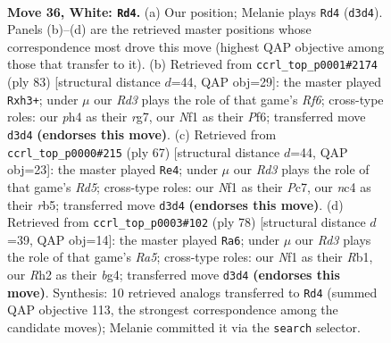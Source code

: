 \documentclass[11pt]{article}
\begin{document}
\clearpage

\begin{figure}[p]\centering
\begin{subfigure}{0.46\textwidth}\centering
\resizebox{\linewidth}{!}{%
\newchessgame
\chessboard[
  setfen={r1b1k3/8/8/1r6/2n4p/p2R3P/6PR/K4N2 w q - 0 36},
  showmover=false,
  pgfstyle=straightmove, color=movearrow, markmove={d3-d4}
]}
\caption{}
\end{subfigure}\hfill
\begin{subfigure}{0.46\textwidth}\centering
\resizebox{\linewidth}{!}{%
\newchessgame
\chessboard[
  setfen={8/6R1/2k2p2/4p3/7p/3P1r1P/2r5/3RB2K b - - 3 42},
  showmover=false,
  pgfstyle=straightmove, color=movearrow, markmove={f3-h3}
]}
\caption{}
\end{subfigure}
\\[4pt]
\begin{subfigure}{0.46\textwidth}\centering
\resizebox{\linewidth}{!}{%
\newchessgame
\chessboard[
  setfen={2k4r/2p5/8/1R6/1P1r1p1p/P6P/2K5/5R2 b - - 0 34},
  showmover=false,
  pgfstyle=straightmove, color=movearrow, markmove={d4-e4}
]}
\caption{}
\end{subfigure}\hfill
\begin{subfigure}{0.46\textwidth}\centering
\resizebox{\linewidth}{!}{%
\newchessgame
\chessboard[
  setfen={8/p3rp2/6pk/RP6/P5bp/8/5P1K/1R6 w - - 2 40},
  showmover=false,
  pgfstyle=straightmove, color=movearrow, markmove={a5-a6}
]}
\caption{}
\end{subfigure}
\caption{\textbf{Move 36, White: \texttt{Rd4}.} (a) Our position; Melanie plays \texttt{Rd4} (\texttt{d3d4}). Panels (b)--(d) are the retrieved master positions whose correspondence most drove this move (highest QAP objective among those that transfer to it). (b) Retrieved from \texttt{ccrl\_top\_p0001\#2174} (ply 83) [structural distance $d$=44, QAP obj=29]: the master played \texttt{Rxh3+}; under $\mu$ our \emph{Rd3} plays the role of that game's \emph{Rf6}; cross-type roles: our \emph{p}h4 as their \emph{r}g7, our \emph{N}f1 as their \emph{P}f6; transferred move \texttt{d3d4} \textbf{(endorses this move)}. (c) Retrieved from \texttt{ccrl\_top\_p0000\#215} (ply 67) [structural distance $d$=44, QAP obj=23]: the master played \texttt{Re4}; under $\mu$ our \emph{Rd3} plays the role of that game's \emph{Rd5}; cross-type roles: our \emph{N}f1 as their \emph{P}c7, our \emph{n}c4 as their \emph{r}b5; transferred move \texttt{d3d4} \textbf{(endorses this move)}. (d) Retrieved from \texttt{ccrl\_top\_p0003\#102} (ply 78) [structural distance $d$=39, QAP obj=14]: the master played \texttt{Ra6}; under $\mu$ our \emph{Rd3} plays the role of that game's \emph{Ra5}; cross-type roles: our \emph{N}f1 as their \emph{R}b1, our \emph{R}h2 as their \emph{b}g4; transferred move \texttt{d3d4} \textbf{(endorses this move)}. Synthesis: 10 retrieved analogs transferred to \texttt{Rd4} (summed QAP objective 113, the strongest correspondence among the candidate moves); Melanie committed it via the \texttt{search} selector.}
\label{fig:thought-m70}
\end{figure}
\end{document}
